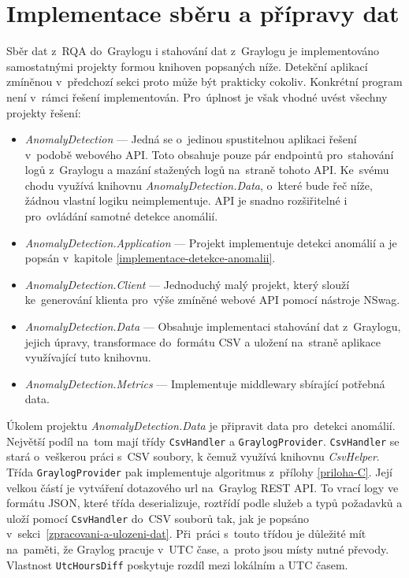 \section{Implementace sběru a přípravy dat}
\label{implementace-sberu-dat}
Sběr dat z~RQA do~Graylogu i stahování dat z~Graylogu je implementováno samostatnými projekty formou knihoven popsaných níže. Detekční aplikací zmíněnou v~předchozí sekci proto může být prakticky cokoliv. Konkrétní program není v~rámci řešení implementován. Pro~úplnost je však vhodné uvést všechny projekty řešení:

\begin{itemize}
  \item \emph{AnomalyDetection} --- Jedná se o~jedinou spustitelnou aplikaci řešení v~podobě webového API. Toto obsahuje pouze pár endpointů pro~stahování logů z~Graylogu a mazání stažených logů na~straně tohoto API. Ke~svému chodu využívá knihovnu \emph{AnomalyDetection.Data}, o~které bude řeč níže, žádnou vlastní logiku neimplementuje. API je snadno rozšiřitelné i pro~ovládání samotné detekce anomálií.
  \item \emph{AnomalyDetection.Application} --- Projekt implementuje detekci anomálií a je popsán v~kapitole \ref{implementace-detekce-anomalii}.
  \item \emph{AnomalyDetection.Client} --- Jednoduchý malý projekt, který slouží ke~generování klienta pro~výše zmíněné webové API pomocí nástroje NSwag.
  \item \emph{AnomalyDetection.Data} --- Obsahuje implementaci stahování dat z~Graylogu, jejich úpravy, transformace do~formátu CSV a uložení na~straně aplikace využívající tuto knihovnu.
  \item \emph{AnomalyDetection.Metrics} --- Implementuje middlewary sbírající potřebná data.
\end{itemize}

Úkolem projektu \emph{AnomalyDetection.Data} je připravit data pro~detekci anomálií. Největší podíl na~tom mají třídy \texttt{CsvHandler} a \texttt{GraylogProvider}. \texttt{CsvHandler} se stará o~veškerou práci s~CSV soubory, k čemuž využívá knihovnu \emph{CsvHelper}. Třída \texttt{GraylogProvider} pak implementuje algoritmus z~přílohy \ref{priloha-C}. Její velkou částí je vytváření dotazového url na~Graylog REST API. To vrací logy ve formátu JSON, které třída deserializuje, roztřídí podle služeb a typů požadavků a uloží pomocí \texttt{CsvHandler} do~CSV souborů tak, jak je popsáno v~sekci~\ref{zpracovani-a-ulozeni-dat}. Při~práci s~touto třídou je důležité mít na~paměti, že Graylog pracuje v~UTC čase, a~proto jsou místy nutné převody. Vlastnost \texttt{UtcHoursDiff} poskytuje rozdíl mezi lokálním a UTC časem.

